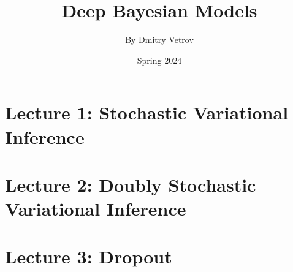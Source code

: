 \documentclass[a4paper]{article}
\title{Deep Bayesian Models}
\author{By Dmitry Vetrov}
\date{Spring 2024}
\begin{document}
\maketitle

\tableofcontents

\newpage
\setlength{\parindent}{0pt}

\section{Lecture 1: Stochastic Variational Inference}



\section{Lecture 2: Doubly Stochastic Variational Inference}



\section{Lecture 3: Dropout}


\end{document}
